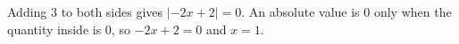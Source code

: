 Adding $3$ to both sides gives $|-2x+2|=0$. An absolute value is $0$ only when the quantity inside is $0$, so $-2x+2=0$ and $x=\boxed{1}$.
